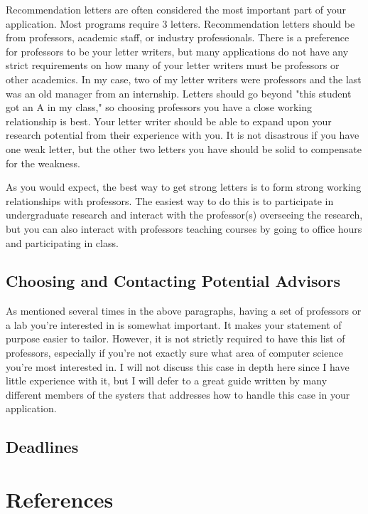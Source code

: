 \documentclass[12pt]{article}
\begin{document}
Recommendation letters are often considered the most important part of your application. Most programs require 3 letters. Recommendation letters should be from professors, academic staff, or industry professionals. There is a preference for professors to be your letter writers, but many applications do not have any strict requirements on how many of your letter writers must be professors or other academics. In my case, two of my letter writers were professors and the last was an old manager from an internship. Letters should go beyond "this student got an A in my class," so choosing professors you have a close working relationship is best. Your letter writer should be able to expand upon your research potential from their experience with you. It is not disastrous if you have one weak letter, but the other two letters you have should be solid to compensate for the weakness.

As you would expect, the best way to get strong letters is to form strong working relationships with professors. The easiest way to do this is to participate in undergraduate research and interact with the professor(s) overseeing the research, but you can also interact with professors teaching courses by going to office hours and participating in class.

\subsection{Choosing and Contacting Potential Advisors}

As mentioned several times in the above paragraphs, having a set of professors or a lab you're interested in is somewhat important. It makes your statement of purpose easier to tailor. However, it is not strictly required to have this list of professors, especially if you're not exactly sure what area of computer science you're most interested in. I will not discuss this case in depth here since I have little experience with it, but I will defer to a great guide written by many different members of the systers that addresses how to handle this case in your application. \cite{systerssop}

\subsection{Deadlines}

\section{References}

\printbibliography[heading=none]
\end{document}
